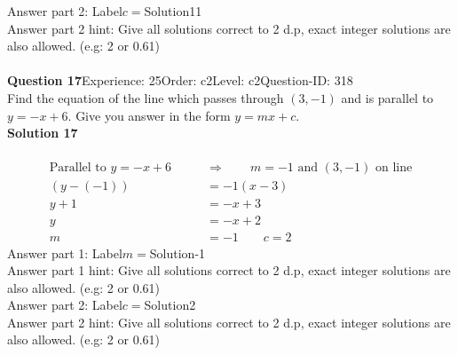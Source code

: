 \documentclass{article}
\begin{document}
Answer part 2: \hspace{10pt}Label\hspace{10pt}$c=$\hspace{10pt}Solution\hspace{10pt}11\\
Answer part 2 hint: \hspace{15pt}Give all solutions correct to 2 d.p, exact integer solutions are also allowed. (e.g: 2 or 0.61)\\
\\[4pt]
\noindent\textbf{Question 17}\hspace{20pt}Experience: 25\hspace{20pt}Order: c2\hspace{20pt}Level: c2\hspace{20pt}Question-ID: 318\\[2pt]
Find the equation of the line which passes through $(3,-1)$ and is parallel to $y=-x+6$. Give you answer in the form $y=mx+c$.\\[4pt]
\noindent\textbf{Solution 17}\\[2pt]
\\[-35pt]\begin{align*}
\text{Parallel to}\,\,y=-x+6\qquad &\Rightarrow \qquad m=-1\,\, \text{and}\,\, (3,-1)\,\, \text{on line}\\[2pt]
(y-(-1))&=-1(x-3)\\[2pt]
y+1&=-x+3\\[2pt]
y&=-x+2\\[2pt]
m&=-1\qquad c=2
\end{align*}
Answer part 1: \hspace{10pt}Label\hspace{10pt}$m=$\hspace{10pt}Solution\hspace{10pt}-1\\
Answer part 1 hint: \hspace{15pt}Give all solutions correct to 2 d.p, exact integer solutions are also allowed. (e.g: 2 or 0.61)\\
Answer part 2: \hspace{10pt}Label\hspace{10pt}$c=$\hspace{10pt}Solution\hspace{10pt}2\\
Answer part 2 hint: \hspace{15pt}Give all solutions correct to 2 d.p, exact integer solutions are also allowed. (e.g: 2 or 0.61)\\
\end{document}

